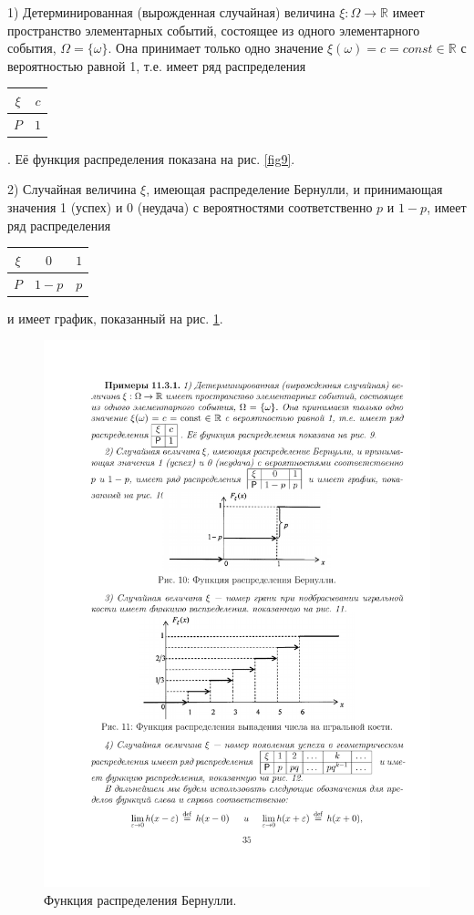 \begin{example}
	1) Детерминированная (вырожденная случайная) величина $\xi : \Omega \rightarrow \mathbb{R}$ имеет пространство элементарных событий, состоящее
из одного элементарного события, $\Omega = \{\omega\}$. Она принимает только одно
значение $\xi(\omega)=c=const\in\mathbb{R}$ с вероятностью равной 1, т.е. имеет ряд
распределения 
\begin{tabular}{|c|c|}
\hline
$\xi$ & $c$\\ \hline
$P$ & $1$\\ \hline
\end{tabular}
. Её функция распределения показана на рис. \ref{fig9}.

2) Случайная величина $\xi$, имеющая распределение Бернулли, и принимающая значения 1 (успех) и 0 (неудача) с вероятностями соответственно
$p$ и $1 − p$, имеет ряд распределения 
\begin{tabular}{|c|c|c|}
\hline
$\xi$ & $0$ & $1$\\ \hline
$P$   & $1-p$ & $p$\\ \hline
\end{tabular}
 и имеет график, показанный на рис. \ref{fig10}.



\begin{figure}[h!]
	\centering
	\includegraphics[]{pic/pic10}
	\caption{Функция распределения Бернулли.}
	\label{fig10}
\end{figure}


\end{example}
